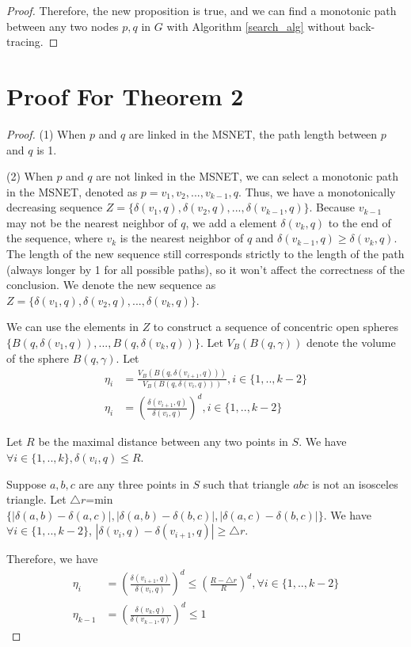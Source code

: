 \documentclass{vldb}
\begin{document}
\begin{appendix}
\begin{proof}
Therefore, the new proposition is true, and we can find a monotonic path between any two nodes $p,q$ in $G$ with Algorithm \ref{search_alg} without back-tracing. 
\end{proof}


\section{Proof For Theorem 2}
\begin{proof}
(1) When $p$ and $q$ are linked in the MSNET, the path length between $p$ and $q$ is 1.

(2) When $p$ and $q$ are not linked in the MSNET, we can select a monotonic path in the MSNET, denoted as $p=v_1, v_2,...,v_{k-1}, q$. Thus, we have a monotonically decreasing sequence $Z = \{\delta(v_1,q), \delta(v_2,q),...,\delta(v_{k-1},q) \}$. Because $v_{k-1}$ may not be the nearest neighbor of $q$, we add a element $\delta(v_{k},q)$ to the end of the sequence, where $v_k$ is the nearest neighbor of $q$ and $\delta(v_{k-1},q) \ge \delta(v_k,q)$. The length of the new sequence still corresponds strictly to the length of the path (always longer by 1 for all possible paths), so it won't affect the correctness of the conclusion. We denote the new sequence as $Z = \{\delta(v_1,q), \delta(v_2,q),...,\delta(v_k,q) \}$.

We can use the elements in $Z$ to construct a sequence of concentric open spheres $\{B(q, \delta(v_1,q)), ... , B(q, \delta(v_{k}, q)) \}$. Let $V_B(B(q, \gamma))$ denote the volume of the sphere $B(q, \gamma)$.   Let
\begin{align*}
\eta_i &= \frac{V_B(B(q, \delta(v_{i+1},q)))}{ V_B(B(q, \delta(v_{i},q)))}, i \in \{1,..,k-2\}\\
\eta_i &= (\frac{\delta(v_{i+1},q)}{\delta(v_{i},q)})^d , i \in \{1,..,k-2\}
\end{align*}

Let $R$ be the maximal distance between any two points in $S$. We have $\forall{i} \in \{1,..,k\}, \delta(v_i,q) \le R$.

Suppose $a,b,c$ are any three points in $S$ such that triangle $abc$ is not an isosceles triangle. Let $\triangle{r}$=min$\{|\delta(a,b) - \delta(a,c)|, |\delta(a,b) - \delta(b,c)|, |\delta(a,c) - \delta(b,c)| \}$. We have $\forall{i} \in \{1,..,k-2\}$, $|\delta(v_i,q)-\delta(v_{i+1},q)| \ge \triangle{r}$.

Therefore, we have
\begin{align*}
\eta_i &= (\frac{\delta(v_{i+1},q)}{\delta(v_i,q)})^d \le (\frac{R-\triangle{r}}{R})^d, \forall{i} \in \{1,..,k-2\}\\
\eta_{k-1} &= (\frac{\delta(v_k,q)}{\delta(v_{k-1},q)})^d \le 1
\end{align*}


\end{proof}
\end{appendix}
\end{document}
